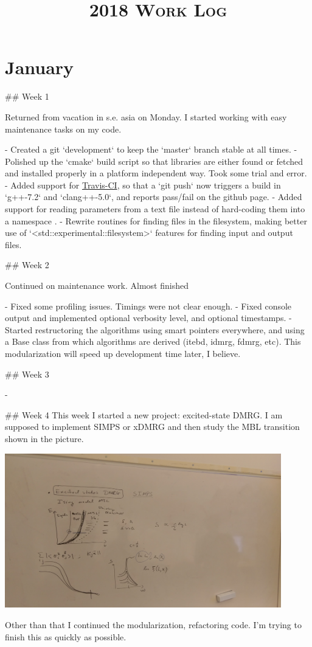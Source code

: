 \documentclass[a4paper]{article}
\title{\textsc{\LARGE 2018 Work Log}\\ }
\date{}
\begin{document}
\maketitle


\section*{January}

\begin{markdown}
## Week 1

Returned from vacation in s.e. asia on Monday. I started working with easy maintenance tasks on my code.

- Created a git `development` to keep the `master` branch stable at all times.
- Polished up the `cmake` build script so that libraries are either found or fetched and installed properly in a platform independent way. Took some trial and error. 
- Added support for \href{www.travis-ci.com}{Travis-CI}, so that a `git push` now triggers a build in `g++-7.2` and `clang++-5.0`, and reports pass/fail on the github page.
- Added support for reading parameters from a text file instead of hard-coding them into a namespace .
- Rewrite routines for finding files in the filesystem, making better use of `<std::experimental::filesystem>` features for finding input and output files.

## Week 2

Continued on maintenance work. Almost finished

- Fixed some profiling issues. Timings were not clear enough.
- Fixed console output and implemented optional verbosity level, and optional timestamps.
- Started restructoring the algorithms using smart pointers everywhere, and using a Base class from which algorithms are derived (itebd, idmrg, fdmrg, etc). This modularization will speed up development time later, I believe.

## Week 3

- 


## Week 4
This week I started a new project: excited-state DMRG. I am supposed to implement SIMPS or xDMRG and then study the MBL transition shown in the picture.

\centering\includegraphics[width=0.9\textwidth, trim=12cm 2cm 40cm 12cm,clip]{figures/mblproject.jpg}

Other than that I continued the modularization, refactoring code. I'm trying to finish this as quickly as possible.

\end{markdown}
\end{document}
